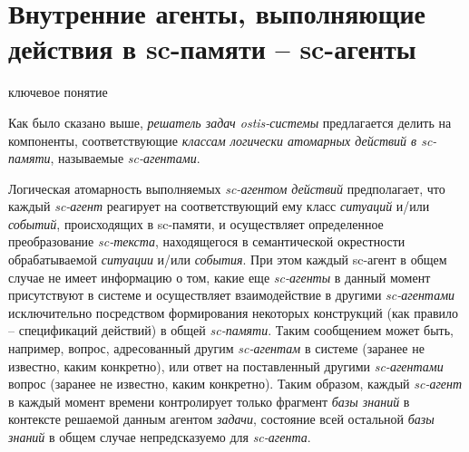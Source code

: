 \section{Внутренние агенты, выполняющие действия в sc-памяти -- sc-агенты}
\label{sec_ps_agents}

\begin{SCn}
\begin{scnrelfromlist}{ключевое понятие}
\end{scnrelfromlist}
\end{SCn}

Как было сказано выше, \textit{решатель задач ostis-системы} предлагается делить на компоненты, соответствующие \textit{классам логически атомарных действий в sc-памяти}, называемые \textit{sc-агентами}.

\begin{SCn}
\end{SCn}

Логическая атомарность выполняемых \textit{sc-агентом} \textit{действий} предполагает, что каждый \textit{sc-агент} реагирует на соответствующий ему класс \textit{ситуаций} и/или \textit{событий}, происходящих в sc-памяти, и осуществляет определенное преобразование \textit{sc-текста}, находящегося в семантической окрестности обрабатываемой \textit{ситуации} и/или \textit{события}. При этом каждый sc-агент в общем случае не имеет информацию о том, какие еще \textit{sc-агенты} в данный момент присутствуют в системе и осуществляет взаимодействие в другими \textit{sc-агентами} исключительно посредством формирования некоторых конструкций (как правило – спецификаций действий) в общей \textit{sc-памяти}. Таким сообщением может быть, например, вопрос, адресованный другим \textit{sc-агентам} в системе (заранее не известно, каким конкретно), или ответ на поставленный другими \textit{sc-агентами} вопрос (заранее не известно, каким конкретно). Таким образом, каждый \textit{sc-агент} в каждый момент времени контролирует только фрагмент \textit{базы знаний} в контексте решаемой данным агентом \textit{задачи}, состояние всей остальной \textit{базы знаний} в общем случае непредсказуемо для \textit{sc-агента}.

